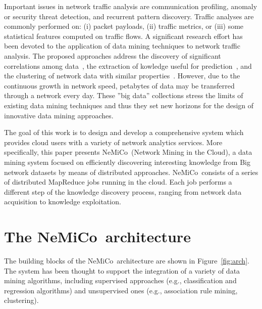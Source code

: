 \documentclass[conference]{IEEEtran}
\newcommand{\Nemico}{{\sc NeMiCo}}
\newcommand{\NemicoDef}{{\sc Ne}twork {\sc Mi}ning in the {\sc C}l{\sc o}ud}
\begin{document}
Important issues in network traffic analysis are communication profiling, anomaly or security threat detection, and recurrent pattern discovery.  
Traffic analyses are commonly performed on: (i) packet payloads, (ii) traffic metrics, or (iii) some statistical features computed on traffic flows. 
A significant research effort has been devoted to the application of data mining techniques to network traffic analysis. The proposed approaches address
the discovery of significant correlations among data~\cite{NostroComNet,EGI}, the extraction of kowledge useful for prediction~\cite{KaragiannisPF05}, and 
the clustering of network data with similar properties~\cite{Erman05}.
However, due to the continuous growth in network speed, petabytes of data may be transferred through a network every day. 
These ''big data'' collections stress the limits of existing data mining techniques and thus they set new horizons for the design of innovative data mining approaches.

The goal of this work is to design and develop a comprehensive system which provides cloud users with a variety of network analytics services. 
More specifically, this paper presents \Nemico\ (\NemicoDef), a data mining system focused on efficiently discovering interesting knowledge from Big network datasets by means of distributed approaches.
\Nemico\ consists of a series of distributed MapReduce jobs running in the cloud. Each job performs a different step of the knowledge discovery process, ranging from network data acquisition to knowledge exploitation. 

\section{The \Nemico\ architecture}
\label{arch}
The building blocks of the \Nemico\ architecture are shown in Figure~\ref{fig:arch}. 
The system has been thought to support the integration of a variety of data mining algorithms, including supervised approaches (e.g., classification and regression algorithms) and unsupervised ones (e.g., association rule mining, clustering).
\end{document}
